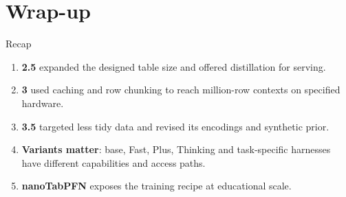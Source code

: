 \documentclass[aspectratio=169]{beamer}
\begin{document}
\section*{Wrap-up}
\begin{frame}{Recap}
  \small
  \begin{enumerate}\itemsep 7pt
    \item \textbf{2.5} expanded the designed table size and offered distillation for serving.
    \item \textbf{3} used caching and row chunking to reach million-row contexts on specified hardware.
    \item \textbf{3.5} targeted less tidy data and revised its encodings and synthetic prior.
    \item \textbf{Variants matter}: base, Fast, Plus, Thinking and task-specific harnesses
      have different capabilities and access paths.
    \item \textbf{nanoTabPFN} exposes the training recipe at educational scale.
  \end{enumerate}
  \vskip 7pt
\end{frame}
\end{document}
